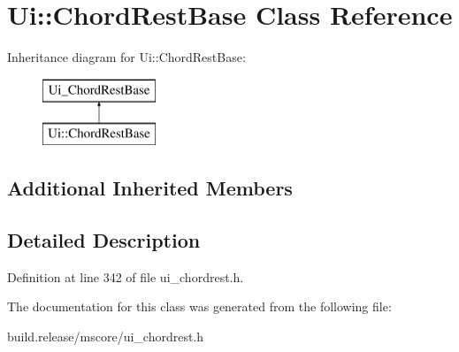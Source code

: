 \hypertarget{class_ui_1_1_chord_rest_base}{}\section{Ui\+:\+:Chord\+Rest\+Base Class Reference}
\label{class_ui_1_1_chord_rest_base}
Inheritance diagram for Ui\+:\+:Chord\+Rest\+Base\+:\begin{figure}[H]
\begin{center}
\leavevmode
\includegraphics[height=2.000000cm]{class_ui_1_1_chord_rest_base}
\end{center}
\end{figure}
\subsection*{Additional Inherited Members}


\subsection{Detailed Description}


Definition at line 342 of file ui\+\_\+chordrest.\+h.



The documentation for this class was generated from the following file\+:\begin{DoxyCompactItemize}
\item 
build.\+release/mscore/ui\+\_\+chordrest.\+h\end{DoxyCompactItemize}
